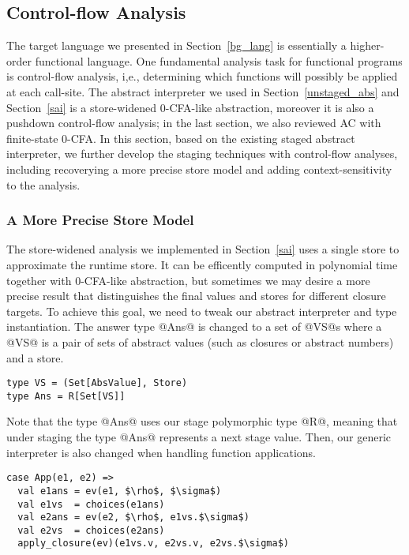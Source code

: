 \subsection{Control-flow Analysis} \label{cfa}

The target language we presented in Section~\ref{bg_lang} is essentially a higher-order functional language.
One fundamental analysis task for functional programs is control-flow analysis, i,e., determining
which functions will possibly be applied at each call-site. 
The abstract interpreter we used in Section~\ref{unstaged_abs} and Section~\ref{sai} is a store-widened 
0-CFA-like abstraction, moreover it is also a pushdown control-flow analysis; 
in the last section, we also reviewed AC with finite-state 0-CFA.
In this section, based on the existing staged abstract interpreter, we further
develop the staging techniques with control-flow analyses, including recoverying a more precise store model and
adding context-sensitivity to the analysis.

\subsubsection{A More Precise Store Model}

The store-widened analysis we implemented in Section~\ref{sai} uses a single store to approximate
the runtime store. It can be efficently computed in polynomial time together with 0-CFA-like abstraction, 
but sometimes we may desire a 
more precise result that distinguishes the final values and stores for different closure targets. 
To achieve this goal,
we need to tweak our abstract interpreter and type instantiation. The answer type @Ans@ is changed to
a set of @VS@s where a @VS@ is a pair of sets of abstract values (such as closures or abstract numbers)
and a store.

\begin{lstlisting}
type VS = (Set[AbsValue], Store)
type Ans = R[Set[VS]]
\end{lstlisting}

Note that the type @Ans@ uses our stage polymorphic type @R@, meaning that under staging the type @Ans@
represents a next stage value. Then, our generic interpreter is also changed when handling function 
applications.

\begin{lstlisting}
case App(e1, e2) =>
  val e1ans = ev(e1, $\rho$, $\sigma$)
  val e1vs  = choices(e1ans)
  val e2ans = ev(e2, $\rho$, e1vs.$\sigma$)
  val e2vs  = choices(e2ans)
  apply_closure(ev)(e1vs.v, e2vs.v, e2vs.$\sigma$)
\end{lstlisting}

